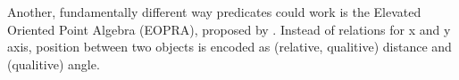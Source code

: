 Another, fundamentally different way predicates could work is the Elevated Oriented Point Algebra (EOPRA), proposed by \cite{EOPRA-Perico2016CollaborativeCO}. Instead of relations for x and y axis, position between two objects is encoded as (relative, qualitive) distance and (qualitive) angle.




